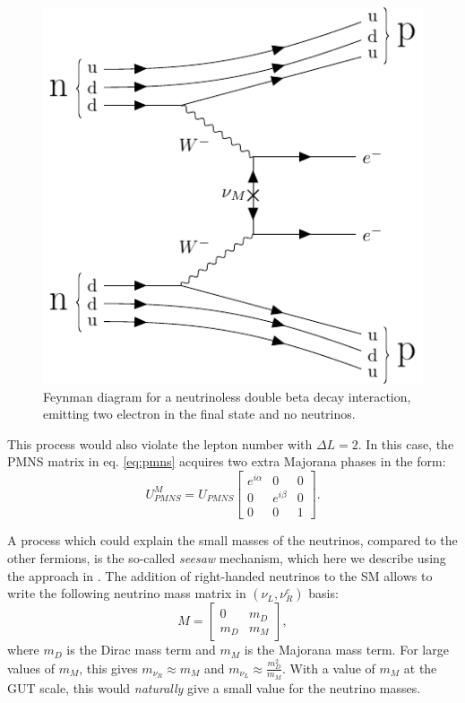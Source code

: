 \begin{figure}[htbp]
    \centering
    \includegraphics[width=0.55\linewidth]{figures/0vbb.pdf}
    \caption{Feynman diagram for a neutrinoless double beta decay interaction, emitting two electron in the final state and no neutrinos.}
    \label{fig:0vbb}
\end{figure}

This process would also violate the lepton number with $\Delta L = 2$. In this case, the PMNS matrix in eq. \eqref{eq:pmns} acquires two extra Majorana phases in the form:
\begin{equation}
    U_{PMNS}^M = U_{PMNS} \begin{bmatrix}
    e^{i\alpha} & 0 & 0 \\
    0 & e^{i\beta} & 0 \\
    0 & 0 & 1
    \end{bmatrix}.
\end{equation}

A process which could explain the small masses of the neutrinos, compared to the other fermions, is the so-called \emph{seesaw} mechanism, which here we describe using the approach in \cite{Grossman:2003eb}. The addition of right-handed neutrinos to the SM allows to write the following neutrino mass matrix in $(\nu_L, \nu_R^c)$ basis:
\begin{equation}
    M = \begin{bmatrix}
    0 & m_D \\
    m_D & m_M
    \end{bmatrix},
\end{equation}
where $m_D$ is the Dirac mass term and $m_M$ is the Majorana mass term. For large values of $m_M$, this gives $m_{\nu_R}\approx m_M$ and $m_{\nu_L}\approx\frac{m_D^2}{m_M}$. With a value of $m_M$ at the GUT scale, this would \emph{naturally} give a small value for the neutrino masses.

